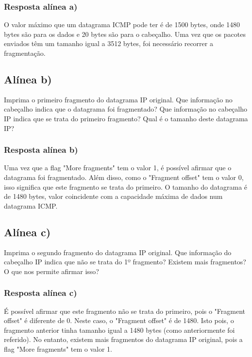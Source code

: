 \documentclass{article}
\begin{document}
\subsubsection{Resposta alínea a)}

O valor máximo que um datagrama ICMP pode ter é de 1500 bytes, onde 1480 bytes são para os dados e 20 bytes são para o cabeçalho. Uma vez que os pacotes enviados têm um tamanho igual a 3512 bytes, foi necessário recorrer a fragmentação.

\subsection{Alínea b)}

Imprima o primeiro fragmento do datagrama IP original. Que informação no cabeçalho indica que o datagrama foi
fragmentado? Que informação no cabeçalho IP indica que se trata do primeiro fragmento? Qual é o tamanho
deste datagrama IP?

\subsubsection{Resposta alínea b)}

Uma vez que a flag "More fragments" tem o valor 1, é possível afirmar que o datagrama foi fragmentado. Além disso, como o "Fragment offset" tem o valor 0, isso significa que este fragmento se trata do primeiro. O tamanho do datagrama é de 1480 bytes, valor coincidente com a capacidade máxima de dados num datagrama ICMP.

\subsection{Alínea c)}

Imprima o segundo fragmento do datagrama IP original. Que informação do cabeçalho IP indica que não se trata
do 1º fragmento? Existem mais fragmentos? O que nos permite afirmar isso?

\subsubsection{Resposta alínea c)}

É possível afirmar que este fragmento não se trata do primeiro, pois o "Fragment offset" é diferente de 0. Neste caso, o "Fragment offset" é de 1480. Isto pois, o fragmento anterior tinha tamanho igual a 1480 bytes (como anteriormente foi referido). No entanto, existem mais fragmentos do datagrama IP original, pois a flag "More fragments" tem o valor 1.
\end{document}
